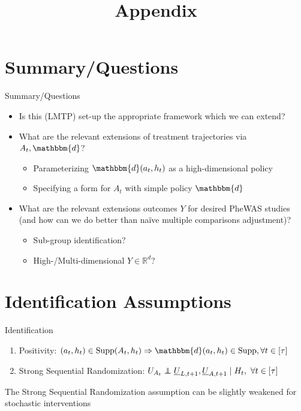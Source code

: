 \documentclass{beamer}
\newcommand{\subitem}[1]{\begin{itemize} \item #1 \end{itemize}}
\newcommand{\widesubitem}[2]{\begin{itemize} \item #1 \end{itemize} \vspace{#2}}
\newcommand{\RR}{\mathbb{R}}
\newcommand{\assign}{\mathbbm{d}}
\newcommand\indp{\protect\mathpalette{\protect\indpT}{\perp}}
\def\indpT#1#2{\mathrel{\rlap{$#1#2$}\mkern2mu{#1#2}}}
\begin{document}
\section{Summary/Questions}

\begin{frame}{Summary/Questions}
    \begin{itemize}\setlength\itemsep{1.5em}
        \item Is this (LMTP) set-up the appropriate framework which we can extend? 
        \item What are the relevant extensions of treatment trajectories via $A_t, \assign$?
        \subitem{Parameterizing $\assign(a_t, h_t)$ as a high-dimensional policy}
        \widesubitem{Specifying a form for $A_t$ with simple policy $\assign$}{0.5em}

        \item What are the relevant extensions outcomes $Y$ for desired PheWAS studies (and how can we do better than na\"ive multiple comparisons adjustment)?
        \subitem{Sub-group identification?}
        \widesubitem{High-/Multi-dimensional $Y\in\RR^d$?}{0.5em}

    \end{itemize}
\end{frame}


\title{Appendix}
\author{} 
\institute{} 
\subtitle{} 
\date{} 
\frame{\titlepage}

\appendix 
    \section{Identification Assumptions} 


    \begin{frame}{Identification}
        \begin{enumerate}
            \item Positivity: $(a_t, h_t) \in \text{Supp}(A_t, h_t) \Rightarrow \assign(a_t, h_t) \in \text{Supp}, \forall t \in [\tau]$ 

            \item Strong Sequential Randomization: $U_{A_t} \indp \underline{U}_{L, t+1}, \underline{U}_{A, t+1} \mid H_t, \ \forall t \in[\tau]$
        \end{enumerate}
        \vspace{2em}

        The Strong Sequential Randomization assumption can be slightly weakened for stochastic interventions

    \end{frame}
\end{document}
